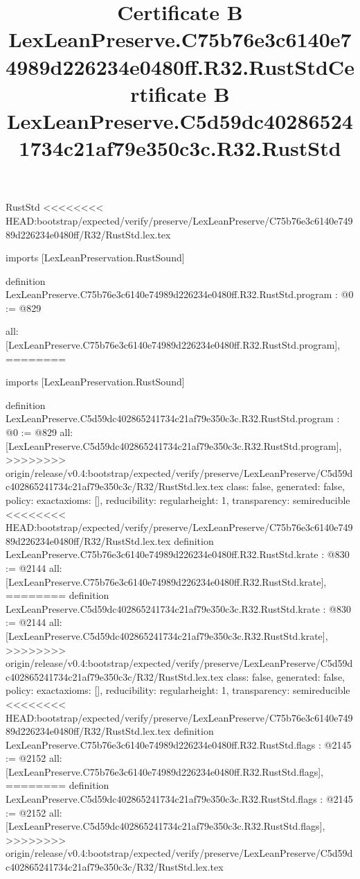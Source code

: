 \begin{lexlean}{RustStd}
<<<<<<<< HEAD:bootstrap/expected/verify/preserve/LexLeanPreserve/C75b76e3c6140e74989d226234e0480ff/R32/RustStd.lex.tex
\title{Certificate B LexLeanPreserve.C75b76e3c6140e74989d226234e0480ff.R32.RustStd}
\begin{coremodule}
imports [LexLeanPreservation.RustSound]

definition LexLeanPreserve.C75b76e3c6140e74989d226234e0480ff.R32.RustStd.program : @0 := @829 {
  all: [LexLeanPreserve.C75b76e3c6140e74989d226234e0480ff.R32.RustStd.program],
========
\title{Certificate B LexLeanPreserve.C5d59dc402865241734c21af79e350c3c.R32.RustStd}
\begin{coremodule}
imports [LexLeanPreservation.RustSound]

definition LexLeanPreserve.C5d59dc402865241734c21af79e350c3c.R32.RustStd.program : @0 := @829 {
  all: [LexLeanPreserve.C5d59dc402865241734c21af79e350c3c.R32.RustStd.program],
>>>>>>>> origin/release/v0.4:bootstrap/expected/verify/preserve/LexLeanPreserve/C5d59dc402865241734c21af79e350c3c/R32/RustStd.lex.tex
  class: false,
  generated: false,
  policy: exact{axioms: []},
  reducibility: regular{height: 1},
  transparency: semireducible
}
<<<<<<<< HEAD:bootstrap/expected/verify/preserve/LexLeanPreserve/C75b76e3c6140e74989d226234e0480ff/R32/RustStd.lex.tex
definition LexLeanPreserve.C75b76e3c6140e74989d226234e0480ff.R32.RustStd.krate : @830 := @2144 {
  all: [LexLeanPreserve.C75b76e3c6140e74989d226234e0480ff.R32.RustStd.krate],
========
definition LexLeanPreserve.C5d59dc402865241734c21af79e350c3c.R32.RustStd.krate : @830 := @2144 {
  all: [LexLeanPreserve.C5d59dc402865241734c21af79e350c3c.R32.RustStd.krate],
>>>>>>>> origin/release/v0.4:bootstrap/expected/verify/preserve/LexLeanPreserve/C5d59dc402865241734c21af79e350c3c/R32/RustStd.lex.tex
  class: false,
  generated: false,
  policy: exact{axioms: []},
  reducibility: regular{height: 1},
  transparency: semireducible
}
<<<<<<<< HEAD:bootstrap/expected/verify/preserve/LexLeanPreserve/C75b76e3c6140e74989d226234e0480ff/R32/RustStd.lex.tex
definition LexLeanPreserve.C75b76e3c6140e74989d226234e0480ff.R32.RustStd.flags : @2145 := @2152 {
  all: [LexLeanPreserve.C75b76e3c6140e74989d226234e0480ff.R32.RustStd.flags],
========
definition LexLeanPreserve.C5d59dc402865241734c21af79e350c3c.R32.RustStd.flags : @2145 := @2152 {
  all: [LexLeanPreserve.C5d59dc402865241734c21af79e350c3c.R32.RustStd.flags],
>>>>>>>> origin/release/v0.4:bootstrap/expected/verify/preserve/LexLeanPreserve/C5d59dc402865241734c21af79e350c3c/R32/RustStd.lex.tex
}}}
\end{coremodule}}
\end{coremodule}
\end{lexlean}
